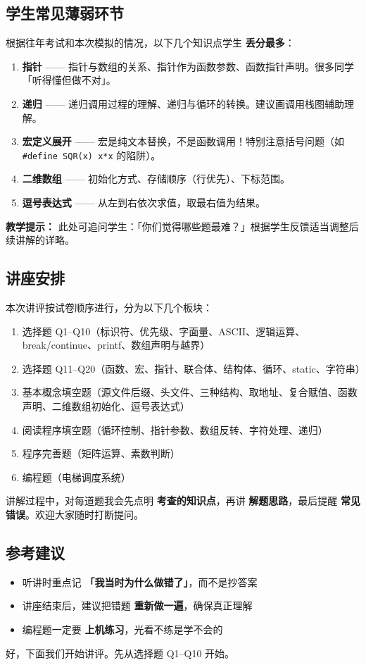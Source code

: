 \subsection{学生常见薄弱环节}

根据往年考试和本次模拟的情况，以下几个知识点学生 \textbf{丢分最多}：

\begin{enumerate}
    \item \textbf{指针} —— 指针与数组的关系、指针作为函数参数、函数指针声明。很多同学「听得懂但做不对」。
    \item \textbf{递归} —— 递归调用过程的理解、递归与循环的转换。建议画调用栈图辅助理解。
    \item \textbf{宏定义展开} —— 宏是纯文本替换，不是函数调用！特别注意括号问题（如 \texttt{\#define SQR(x) x*x} 的陷阱）。
    \item \textbf{二维数组} —— 初始化方式、存储顺序（行优先）、下标范围。
    \item \textbf{逗号表达式} —— 从左到右依次求值，取最右值为结果。
\end{enumerate}

\textbf{教学提示：} 此处可追问学生：「你们觉得哪些题最难？」根据学生反馈适当调整后续讲解的详略。

\subsection{讲座安排}

本次讲评按试卷顺序进行，分为以下几个板块：

\begin{enumerate}
    \item 选择题 Q1--Q10（标识符、优先级、字面量、ASCII、逻辑运算、break/continue、printf、数组声明与越界）
    \item 选择题 Q11--Q20（函数、宏、指针、联合体、结构体、循环、static、字符串）
    \item 基本概念填空题（源文件后缀、头文件、三种结构、取地址、复合赋值、函数声明、二维数组初始化、逗号表达式）
    \item 阅读程序填空题（循环控制、指针参数、数组反转、字符处理、递归）
    \item 程序完善题（矩阵运算、素数判断）
    \item 编程题（电梯调度系统）
\end{enumerate}

讲解过程中，对每道题我会先点明 \textbf{考查的知识点}，再讲 \textbf{解题思路}，最后提醒 \textbf{常见错误}。欢迎大家随时打断提问。

\subsection{参考建议}

\begin{itemize}
    \item 听讲时重点记 \textbf{「我当时为什么做错了」}，而不是抄答案
    \item 讲座结束后，建议把错题 \textbf{重新做一遍}，确保真正理解
    \item 编程题一定要 \textbf{上机练习}，光看不练是学不会的
\end{itemize}

好，下面我们开始讲评。先从选择题 Q1--Q10 开始。
